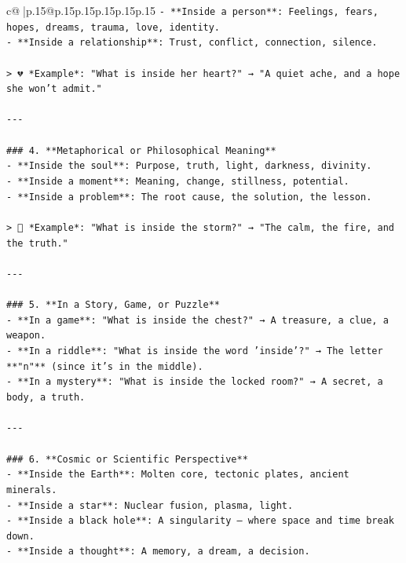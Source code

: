 \documentclass{article}
\begin{document}
{\begin{supertabular}{c@{$\;$}|p{.15\linewidth}@{}p{.15\linewidth}p{.15\linewidth}p{.15\linewidth}p{.15\linewidth}p{.15\linewidth}}
{{{\texttt{{-} **Inside a person**: Feelings, fears, hopes, dreams, trauma, love, identity.} \\
\texttt{{-} **Inside a relationship**: Trust, conflict, connection, silence.} \\
\\ 
\texttt{> 💔 *Example*: "What is inside her heart?" → "A quiet ache, and a hope she won’t admit."} \\
\\ 
\texttt{{-}{-}{-}} \\
\\ 
\texttt{\#\#\# 4. **Metaphorical or Philosophical Meaning**} \\
\texttt{{-} **Inside the soul**: Purpose, truth, light, darkness, divinity.} \\
\texttt{{-} **Inside a moment**: Meaning, change, stillness, potential.} \\
\texttt{{-} **Inside a problem**: The root cause, the solution, the lesson.} \\
\\ 
\texttt{> 🌿 *Example*: "What is inside the storm?" → "The calm, the fire, and the truth."} \\
\\ 
\texttt{{-}{-}{-}} \\
\\ 
\texttt{\#\#\# 5. **In a Story, Game, or Puzzle**} \\
\texttt{{-} **In a game**: "What is inside the chest?" → A treasure, a clue, a weapon.} \\
\texttt{{-} **In a riddle**: "What is inside the word 'inside'?" → The letter **"n"** (since it’s in the middle).} \\
\texttt{{-} **In a mystery**: "What is inside the locked room?" → A secret, a body, a truth.} \\
\\ 
\texttt{{-}{-}{-}} \\
\\ 
\texttt{\#\#\# 6. **Cosmic or Scientific Perspective**} \\
\texttt{{-} **Inside the Earth**: Molten core, tectonic plates, ancient minerals.} \\
\texttt{{-} **Inside a star**: Nuclear fusion, plasma, light.} \\
\texttt{{-} **Inside a black hole**: A singularity — where space and time break down.} \\
\texttt{{-} **Inside a thought**: A memory, a dream, a decision.} \\
}}}
\end{supertabular}}
\end{document}
